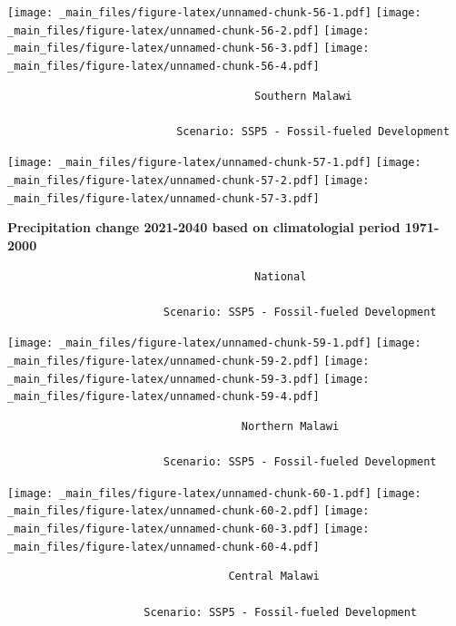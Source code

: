 \documentclass[
]{book}
\begin{document}
\texttt{[image: \_main\_files/figure-latex/unnamed-chunk-56-1.pdf]} \texttt{[image: \_main\_files/figure-latex/unnamed-chunk-56-2.pdf]} \texttt{[image: \_main\_files/figure-latex/unnamed-chunk-56-3.pdf]} \texttt{[image: \_main\_files/figure-latex/unnamed-chunk-56-4.pdf]}

\begin{verbatim}
                                      Southern Malawi
                                      
                          Scenario: SSP5 - Fossil-fueled Development
\end{verbatim}

\texttt{[image: \_main\_files/figure-latex/unnamed-chunk-57-1.pdf]} \texttt{[image: \_main\_files/figure-latex/unnamed-chunk-57-2.pdf]} \texttt{[image: \_main\_files/figure-latex/unnamed-chunk-57-3.pdf]}

\textbf{Precipitation change 2021-2040 based on climatologial period 1971-2000}

\begin{verbatim}
                                      National
                                    
                        Scenario: SSP5 - Fossil-fueled Development
\end{verbatim}

\texttt{[image: \_main\_files/figure-latex/unnamed-chunk-59-1.pdf]} \texttt{[image: \_main\_files/figure-latex/unnamed-chunk-59-2.pdf]} \texttt{[image: \_main\_files/figure-latex/unnamed-chunk-59-3.pdf]} \texttt{[image: \_main\_files/figure-latex/unnamed-chunk-59-4.pdf]}

\begin{verbatim}
                                    Northern Malawi
                                    
                        Scenario: SSP5 - Fossil-fueled Development      
\end{verbatim}

\texttt{[image: \_main\_files/figure-latex/unnamed-chunk-60-1.pdf]} \texttt{[image: \_main\_files/figure-latex/unnamed-chunk-60-2.pdf]} \texttt{[image: \_main\_files/figure-latex/unnamed-chunk-60-3.pdf]} \texttt{[image: \_main\_files/figure-latex/unnamed-chunk-60-4.pdf]}

\begin{verbatim}
                                  Central Malawi
                                  
                     Scenario: SSP5 - Fossil-fueled Development
\end{verbatim}
\end{document}
